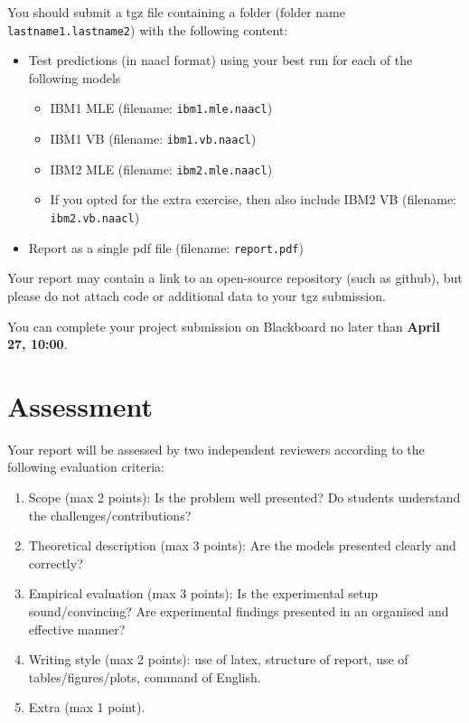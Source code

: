 You should submit a tgz file containing a folder (folder name {\tt lastname1.lastname2}) with the following content: 
\begin{itemize}
	\item Test predictions (in naacl format) using your best run for each of the following models
	\begin{itemize}
		\item IBM1 MLE (filename: {\tt ibm1.mle.naacl})
		\item IBM1 VB (filename: {\tt ibm1.vb.naacl})
		\item IBM2 MLE (filename: {\tt ibm2.mle.naacl})
		\item If you opted for the extra exercise, then also include IBM2 VB (filename: {\tt ibm2.vb.naacl})
	\end{itemize}
	\item Report as a single pdf file (filename: {\tt report.pdf})
\end{itemize}

Your report may contain a link to an open-source repository (such as github), but please do not attach code or additional data to your tgz submission.

You can complete your project submission on Blackboard no later than {\bf April 27, 10:00}.


\section{Assessment}

Your report will be assessed by two independent reviewers according to the following evaluation criteria:
\begin{enumerate}
	\item Scope (max 2 points): Is the problem well presented? Do students understand the challenges/contributions?
	\item Theoretical description (max 3 points): Are the models presented clearly and correctly?
	\item Empirical evaluation (max 3 points): Is the experimental setup sound/convincing? Are experimental findings presented in an organised and effective manner? 
	\item Writing style (max 2 points): use of latex, structure of report, use of tables/figures/plots, command of English.	
	\item Extra (max 1 point).
\end{enumerate}



